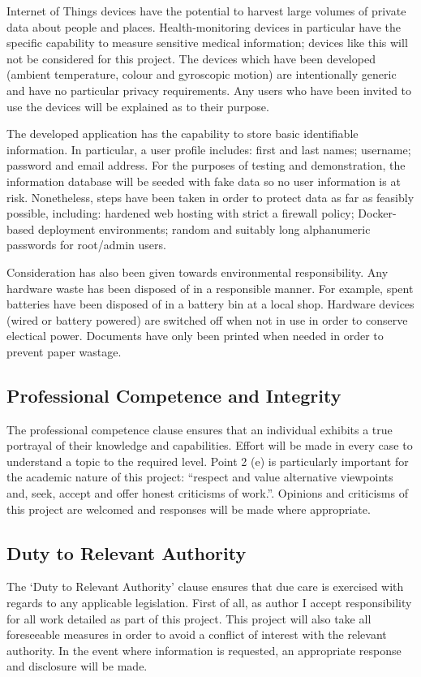       Internet of Things devices have the potential to harvest large volumes of private data about people and places. Health-monitoring devices in particular have the specific capability to measure sensitive medical information; devices like this will not be considered for this project. The devices which have been developed (ambient temperature, colour and gyroscopic motion) are intentionally generic and have no particular privacy requirements. Any users who have been invited to use the devices will be explained as to their purpose.

      The developed application has the capability to store basic identifiable information. In particular, a user profile includes: first and last names; username; password and email address. For the purposes of testing and demonstration, the information database will be seeded with fake data so no user information is at risk. Nonetheless, steps have been taken in order to protect data as far as feasibly possible, including: hardened web hosting with strict a firewall policy; Docker-based deployment environments; random and suitably long alphanumeric passwords for root/admin users.

      Consideration has also been given towards environmental responsibility. Any hardware waste has been disposed of in a responsible manner. For example, spent batteries have been disposed of in a battery bin at a local shop. Hardware devices (wired or battery powered) are switched off when not in use in order to conserve electical power. Documents have only been printed when needed in order to prevent paper wastage. 

    \subsection{Professional Competence and Integrity}
      The professional competence clause ensures that an individual exhibits a true portrayal of their knowledge and capabilities. Effort will be made in every case to understand a topic to the required level. Point 2 (e) is particularly important for the academic nature of this project: ``respect and value alternative viewpoints and, seek, accept and offer honest criticisms of work.''. Opinions and criticisms of this project are welcomed and responses will be made where appropriate. 

    \subsection{Duty to Relevant Authority}
      The `Duty to Relevant Authority' clause ensures that due care is exercised with regards to any applicable legislation. First of all, as author I accept responsibility for all work detailed as part of this project. This project will also take all foreseeable measures in order to avoid a conflict of interest with the relevant authority. In the event where information is requested, an appropriate response and disclosure will be made.

